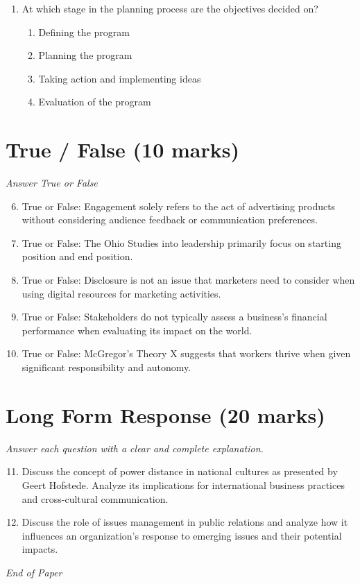 \documentclass[12pt]{article}
\begin{document}
\begin{enumerate}[label=\arabic*.]
\begin{enumerate}[label=(\alph*)]
    \item Line management
    \item Supplier
\end{enumerate}
\item At which stage in the planning process are the objectives decided on?
\begin{enumerate}[label=(\alph*)]
    \item Defining the program
    \item Planning the program
    \item Taking action and implementing ideas
    \item Evaluation of the program
\end{enumerate}
\end{enumerate}

\section*{True / False (10 marks)}
\textit{Answer True or False}
\begin{enumerate}[label=\arabic*.]
\setcounter{enumi}{5}
\item True or False: Engagement solely refers to the act of advertising products without considering audience feedback or communication preferences.
\item True or False: The Ohio Studies into leadership primarily focus on starting position and end position.
\item True or False: Disclosure is not an issue that marketers need to consider when using digital resources for marketing activities.
\item True or False: Stakeholders do not typically assess a business's financial performance when evaluating its impact on the world.
\item True or False: McGregor's Theory X suggests that workers thrive when given significant responsibility and autonomy.
\end{enumerate}

\section*{Long Form Response (20 marks)}
\textit{Answer each question with a clear and complete explanation.}
\begin{enumerate}[label=\arabic*.]
\setcounter{enumi}{10}
\item Discuss the concept of power distance in national cultures as presented by Geert Hofstede. Analyze its implications for international business practices and cross-cultural communication.
\item Discuss the role of issues management in public relations and analyze how it influences an organization's response to emerging issues and their potential impacts.
\end{enumerate}

\vfill
\noindent\textit{End of Paper}
\end{document}
